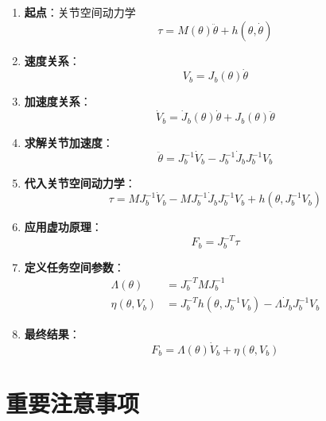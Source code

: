 \documentclass{article}
\begin{document}
\begin{enumerate}
\item \textbf{起点}：关节空间动力学
\begin{equation}
\tau = M(\theta)\ddot{\theta} + h(\theta, \dot{\theta})
\end{equation}

\item \textbf{速度关系}：
\begin{equation}
V_b = J_b(\theta)\dot{\theta}
\end{equation}

\item \textbf{加速度关系}：
\begin{equation}
\dot{V}_b = \dot{J}_b(\theta)\dot{\theta} + J_b(\theta)\ddot{\theta}
\end{equation}

\item \textbf{求解关节加速度}：
\begin{equation}
\ddot{\theta} = J_b^{-1}\dot{V}_b - J_b^{-1}\dot{J}_b J_b^{-1}V_b
\end{equation}

\item \textbf{代入关节空间动力学}：
\begin{equation}
\tau = M J_b^{-1}\dot{V}_b - M J_b^{-1}\dot{J}_b J_b^{-1}V_b + h(\theta, J_b^{-1}V_b)
\end{equation}

\item \textbf{应用虚功原理}：
\begin{equation}
F_b = J_b^{-T}\tau
\end{equation}

\item \textbf{定义任务空间参数}：
\begin{align}
\Lambda(\theta) &= J_b^{-T}M J_b^{-1} \\
\eta(\theta, V_b) &= J_b^{-T}h(\theta, J_b^{-1}V_b) - \Lambda\dot{J}_b J_b^{-1}V_b
\end{align}

\item \textbf{最终结果}：
\begin{equation}
F_b = \Lambda(\theta)\dot{V}_b + \eta(\theta, V_b)
\end{equation}
\end{enumerate}

\section{重要注意事项}
\end{document}

